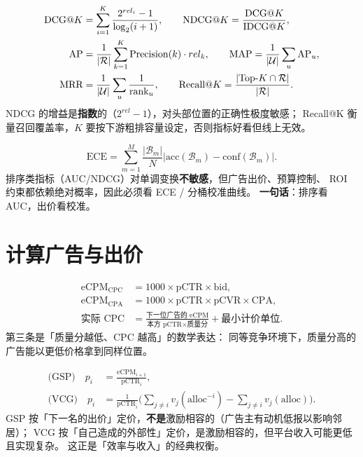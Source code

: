 \begin{formulacard}
\begin{align}
\text{DCG@}K &= \sum_{i=1}^{K} \frac{2^{rel_i} - 1}{\log_2(i+1)} ,
\qquad \text{NDCG@}K = \frac{\text{DCG@}K}{\text{IDCG@}K} , \\
\text{AP} &= \frac{1}{|\mathcal{R}|}\sum_{k=1}^{K} \operatorname{Precision}(k) \cdot rel_k ,
\qquad \text{MAP} = \frac{1}{|\mathcal{U}|}\sum_{u} \text{AP}_u , \\
\text{MRR} &= \frac{1}{|\mathcal{U}|}\sum_{u} \frac{1}{\text{rank}_u} ,
\qquad \text{Recall@}K = \frac{|\text{Top-}K \cap \mathcal{R}|}{|\mathcal{R}|} .
\end{align}
NDCG 的增益是\textbf{指数}的（$2^{rel}-1$），对头部位置的正确性极度敏感；
Recall@K 衡量召回覆盖率，$K$ 要按下游粗排容量设定，否则指标好看但线上无效。
\end{formulacard}

\begin{formulacard}
\begin{equation}
\text{ECE} = \sum_{m=1}^{M} \frac{|\mathcal{B}_m|}{N}
\left| \text{acc}(\mathcal{B}_m) - \text{conf}(\mathcal{B}_m) \right| .
\end{equation}
排序类指标（AUC/NDCG）对单调变换\textbf{不敏感}，但广告出价、预算控制、
ROI 约束都依赖绝对概率，因此必须看 ECE / 分桶校准曲线。
\textbf{一句话}：排序看 AUC，出价看校准。
\end{formulacard}

\section{计算广告与出价}

\begin{formulacard}
\begin{align}
\text{eCPM}_{\text{CPC}} &= 1000 \times \text{pCTR} \times \text{bid} , \\
\text{eCPM}_{\text{CPA}} &= 1000 \times \text{pCTR} \times \text{pCVR} \times \text{CPA} , \\
\text{实际 CPC} &= \frac{\text{下一位广告的 eCPM}}{\text{本方 pCTR} \times \text{质量分}} + \text{最小计价单位} .
\end{align}
第三条是「质量分越低、CPC 越高」的数学表达：
同等竞争环境下，质量分高的广告能以更低价格拿到同样位置。
\end{formulacard}

\begin{formulacard}
\begin{align}
\text{(GSP)} \quad p_i &= \frac{\text{eCPM}_{i+1}}{\text{pCTR}_i} , \\
\text{(VCG)} \quad p_i &= \frac{1}{\text{pCTR}_i}\Big( \sum_{j \neq i} v_j(\text{alloc}^{-i}) - \sum_{j \neq i} v_j(\text{alloc}) \Big) .
\end{align}
GSP 按「下一名的出价」定价，\textbf{不是}激励相容的（广告主有动机低报以影响邻居）；
VCG 按「自己造成的外部性」定价，是激励相容的，但平台收入可能更低且实现复杂。
这正是「效率与收入」的经典权衡。
\end{formulacard}

